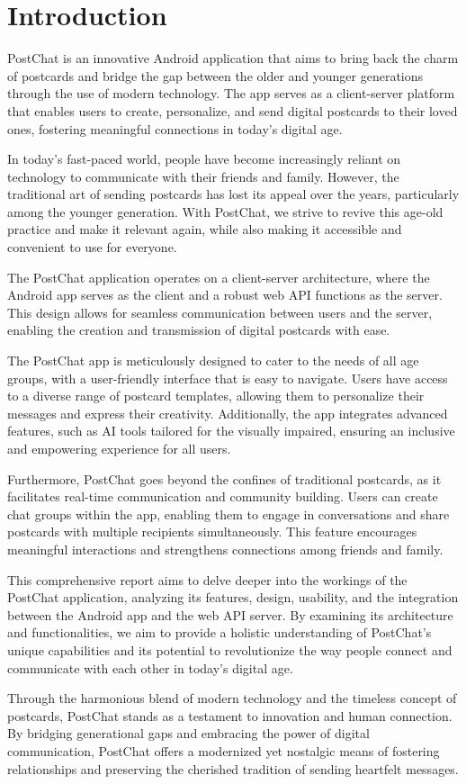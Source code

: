 
\chapter{Introduction} 
\label{ch:Chapter1}
\vfill \newpage
\noindent

PostChat is an innovative Android application that aims to bring back the charm of postcards and bridge the gap between the older and younger generations through the use of modern technology. The app serves as a client-server platform that enables users to create, personalize, and send digital postcards to their loved ones, fostering meaningful connections in today's digital age.

In today's fast-paced world, people have become increasingly reliant on technology to communicate with their friends and family. However, the traditional art of sending postcards has lost its appeal over the years, particularly among the younger generation. With PostChat, we strive to revive this age-old practice and make it relevant again, while also making it accessible and convenient to use for everyone.

The PostChat application operates on a client-server architecture, where the Android app serves as the client and a robust web API functions as the server. This design allows for seamless communication between users and the server, enabling the creation and transmission of digital postcards with ease.

The PostChat app is meticulously designed to cater to the needs of all age groups, with a user-friendly interface that is easy to navigate. Users have access to a diverse range of postcard templates, allowing them to personalize their messages and express their creativity. Additionally, the app integrates advanced features, such as AI tools tailored for the visually impaired, ensuring an inclusive and empowering experience for all users.

Furthermore, PostChat goes beyond the confines of traditional postcards, as it facilitates real-time communication and community building. Users can create chat groups within the app, enabling them to engage in conversations and share postcards with multiple recipients simultaneously. This feature encourages meaningful interactions and strengthens connections among friends and family.

This comprehensive report aims to delve deeper into the workings of the PostChat application, analyzing its features, design, usability, and the integration between the Android app and the web API server. By examining its architecture and functionalities, we aim to provide a holistic understanding of PostChat's unique capabilities and its potential to revolutionize the way people connect and communicate with each other in today's digital age.

Through the harmonious blend of modern technology and the timeless concept of postcards, PostChat stands as a testament to innovation and human connection. By bridging generational gaps and embracing the power of digital communication, PostChat offers a modernized yet nostalgic means of fostering relationships and preserving the cherished tradition of sending heartfelt messages.